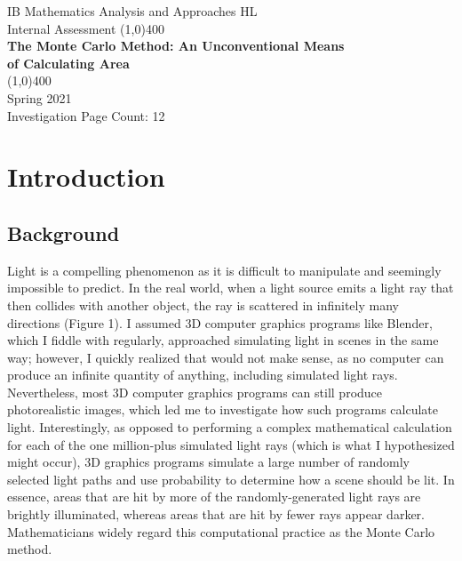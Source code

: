 \documentclass[11pt]{article}
\begin{document}
\begin{titlepage}
\begin{center}
\vspace*{1cm}
\Large{{IB Mathematics Analysis and Approaches HL}}\\
\Large{Internal Assessment}
\vfill
\line(1,0){400}\\[1mm]
\Large{\textbf{The Monte Carlo Method: An Unconventional Means\\of Calculating Area}}\\
\line(1,0){400}\\
\vfill
\normalsize Spring 2021\\ 
\normalsize Investigation Page Count: 12\\


\end{center}
\end{titlepage}

\tableofcontents
\thispagestyle{empty}
\clearpage

\setcounter{page}{1}

\section{Introduction}
\subsection{Background}
Light is a compelling phenomenon as it is difficult to manipulate and seemingly impossible to predict. In the real world, when a light source emits a light ray that then collides with another object, the ray is scattered in infinitely many directions (Figure 1). I assumed 3D computer graphics programs like Blender, which I fiddle with regularly, approached simulating light in scenes in the same way; however, I quickly realized that would not make sense, as no computer can produce an infinite quantity of anything, including simulated light rays. Nevertheless, most 3D computer graphics programs can still produce photorealistic images, which led me to investigate how such programs calculate light. Interestingly, as opposed to performing a complex mathematical calculation for each of the one million-plus simulated light rays (which is what I hypothesized might occur), 3D graphics programs simulate a large number of randomly selected light paths and use probability to determine how a scene should be lit. In essence, areas that are hit by more of the randomly-generated light rays are brightly illuminated, whereas areas that are hit by fewer rays appear darker. Mathematicians widely regard this computational practice as the Monte Carlo method.\cite{blenderrender}\\
\end{document}
